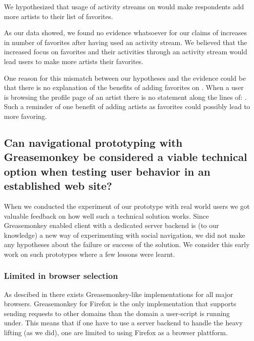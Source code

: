 We hypothesized that usage of activity streams on \urort{} would
make respondents add more artists to their list of favorites.

As our data%
showed, we found no evidence whatsoever for our claims of increases in
number of favorites after having used an activity stream.
We believed that the increased focus on favorites and their activities through
an activity stream would lead users to make more artists their favorites.

One reason for this mismatch between our hypotheses and the evidence could be
that there is no explanation of the benefits of adding favorites on \urort{}.
When a user is browsing the profile page of an artist there is no statement
along the lines of: . Such a reminder of one benefit of adding
artists as favorites could possibly lead to more favoring.

\subsection{%
  Can navigational prototyping with Greasemonkey be considered a
  viable technical option when testing user behavior in an
  established web site?
}

When we conducted the experiment of our prototype with real world users
we got valuable feedback on how well such a technical solution works.
Since Greasemonkey enabled client with a dedicated server backend is (to our
knowledge) a new way of experimenting with social navigation, we did not
make any hypotheses about the failure or success of the solution.
We consider this early work on such prototypes where a few lessons
were learnt.

\subsubsection{Limited in browser selection}

As descibed in
 there exists Greasemonkey-like
implementations for all major browsers. Greasemonkey for Firefox is the only
implementation that supports sending requests to other domains than the domain
a user-script is running under. This means that if one have to use a server
backend to handle the heavy lifting (as we did), one are limited to
using Firefox as a browser plattform.%

